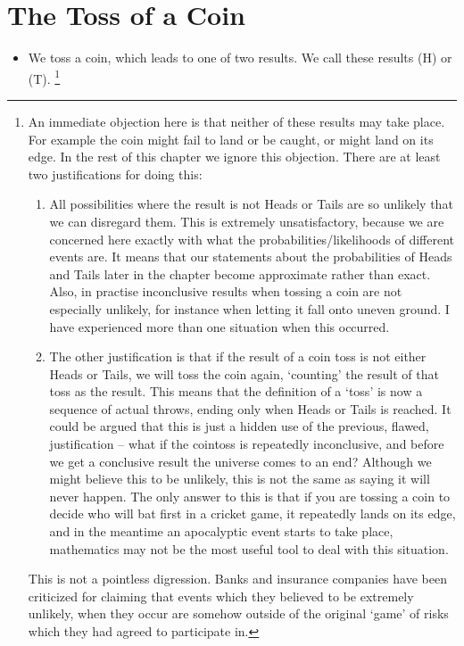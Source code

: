 \chapter{The Toss of a Coin}
\label{coin}
\begin{itemize}
\item
We toss a coin, which leads to one of two results. We call these results  (H) or  (T). \footnote{An immediate objection here is that neither of these results may take place. For example the coin might fail to land or be caught, or might land on its edge.  In the rest of this chapter we ignore this objection. There are at least two justifications for doing this:
\begin{enumerate}
\item
All possibilities where the result is not Heads or Tails are so unlikely that we can disregard them. This is extremely unsatisfactory, because we are concerned here exactly with what the probabilities/likelihoods of different events are. It means that our statements about the probabilities of Heads and Tails later in the chapter become approximate rather than exact. Also, in practise inconclusive results when tossing a coin are not especially unlikely, for instance when letting it fall onto uneven ground. I have experienced more than one situation when this occurred.
\item
The other justification is that if the result of a coin toss is not either Heads or Tails, we will toss the coin again, `counting' the result of that toss as the result. This means that the definition of a `toss' is now a sequence of actual throws, ending only when Heads or Tails is reached. It could be argued that this is just a hidden use of the previous, flawed, justification -- what if the cointoss is repeatedly inconclusive, and before we get a conclusive result the universe comes to an end? Although we might believe this to be unlikely, this is not the same as saying it will never happen. The only answer to this is that if you are tossing a coin to decide who will bat first in a cricket game, it repeatedly lands on its edge, and in the meantime an apocalyptic event starts to take place, mathematics may not be the most useful tool to deal with this situation. 
\end{enumerate}
This is not a pointless digression. Banks and insurance companies have been criticized for claiming that events which they believed to be extremely unlikely, when they occur are somehow outside of the original `game' of risks which they had agreed to participate in.}

\end{itemize}
